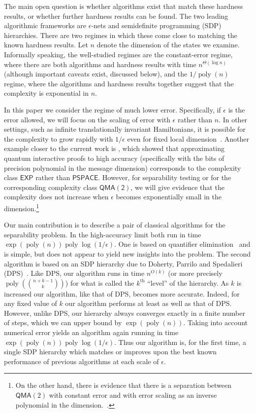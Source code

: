 \documentclass[aps,pra,notitlepage,preprintnumbers,11pt,tightenlines]{revtex4-1}
\newcommand{\eps}{\epsilon}
\DeclareMathOperator{\poly}{poly}
\begin{document}
The main open question is whether algorithms exist that match these
hardness results, or whether further hardness results can be found.
The two leading algorithmic frameworks are $\eps$-nets and
semidefinite programming (SDP) hierarchies.  There are two regimes in
which these come close to matching the known hardness results.  Let
$n$ denote the dimension of the states we examine.  Informally
speaking, the well-studied regimes are the constant-error regime,
where there are both algorithms and hardness results with time
$n^{\Theta(\log n)}$ (although important caveats exist, discussed below),
and the $1/\poly(n)$ regime, where the algorithms and hardness results
together suggest that the complexity is exponential in $n$.

In this paper we consider the regime of much lower error.
Specifically, if $\eps$ is the error allowed, we will focus on the
scaling of error with $\eps$ rather than $n$.  In other settings, such
as infinite translationally invariant Hamiltonians, it is possible for
the complexity to grow rapidly with $1/\eps$ even for fixed local
dimension~\cite{CPW14}.  Another example closer to the current
work is \cite{ItoKW12}, which showed that approximating quantum
interactive proofs to high accuracy (specifically with the bits of
precision polynomial in the message dimension) corresponds to the complexity
class $\mathsf{EXP}$ rather than $\mathsf{PSPACE}$. However, for
separability testing or for the corresponding complexity class $\mathsf{QMA(2)}$,
we will give evidence that the complexity does not increase when $\eps$ becomes
exponentially small in the dimension.\footnote{On the other hand, there is
evidence that there is a separation between $\mathsf{QMA}(2)$ with
constant error and with error scaling as an inverse polynomial in the
dimension.~\cite{pereszlenyi:2012}.}

Our main contribution is to describe a pair of classical algorithms
for the separability problem.  In the high-accuracy limit both run in
time $\exp(\poly(n))\poly\log(1/\eps)$.  One is based on quantifier
elimination~\cite{Basu96} and is simple, but does not appear to yield
new insights into the problem.  The second algorithm is based on an
SDP hierarchy due to Doherty, Parrilo and Spedalieri
(DPS)~\cite{dps:2003}.  Like DPS, our algorithm runs in time
$n^{O(k)}$ (or more precisely $\poly(\binom{n+k-1}{k})$) for what is
called the $k^{\text{th}}$ ``level'' of the hierarchy.  As $k$ is
increased our algorithm, like that of DPS, becomes more accurate.
Indeed, for any fixed value of $k$ our algorithm performs at least as
well as that of DPS.  However, unlike DPS, our hierarchy always
converges exactly in a finite number of steps, which we can upper
bound by $\exp(\poly(n))$.  Taking into account numerical error yields
an algorithm again running in time $\exp(\poly(n))\poly\log(1/\eps)$.
Thus our algorithm is, for the first time, a single SDP hierarchy
which matches or improves upon the best known performance of previous
algorithms at each scale of $\eps$.
\end{document}
